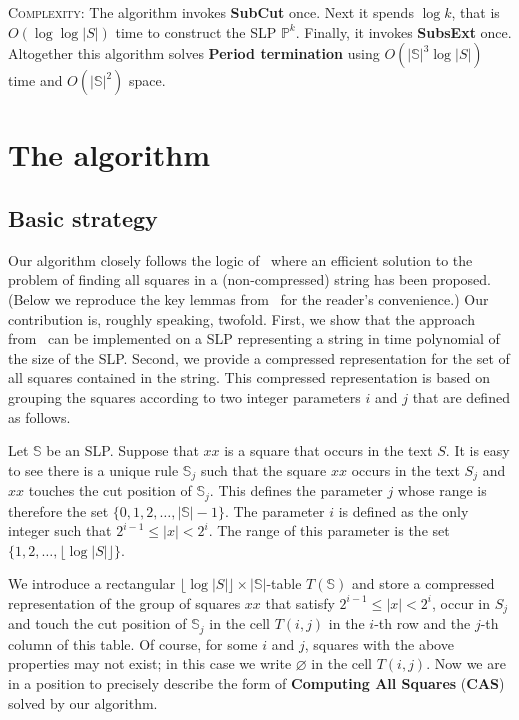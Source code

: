\documentclass[11pt]{article}
\theoremstyle{break}
\newcommand{\slp}[1]{\mathbb{#1}}
\begin{document}
\smallskip

\noindent \textsc{Complexity:} The algorithm invokes \textbf{SubCut} once. Next it spends $\log k$, that is $O(\log\log|S|)$ time to
construct the SLP $\slp{P}^k$. Finally, it invokes \textbf{SubsExt} once. Altogether this algorithm solves \textbf{Period termination}
using $O(|\slp{S}|^3 \log|S|)$ time and $O(|\slp{S}|^2)$ space.

\section{The algorithm}

\subsection{Basic strategy}

Our algorithm closely follows the logic of~\cite{2} where an efficient solution to the problem of finding all squares in a (non-compressed)
string has been proposed. (Below we reproduce the key lemmas from~\cite{2} for the reader's convenience.) Our contribution is, roughly
speaking, twofold. First, we show that the approach from~\cite{2} can be implemented on a SLP representing a string in time polynomial of
the size of the SLP. Second, we provide a compressed representation for the set of all squares contained in the string. This compressed
representation is based on grouping the squares according to two integer parameters $i$ and $j$ that are defined as follows.

Let $\slp{S}$ be an SLP. Suppose that $xx$ is a square that occurs in the text $S$. It is easy to see there is a unique rule $\slp{S}_j$
such that the square $xx$ occurs in the text $S_j$ and $xx$ touches the cut position of $\slp{S}_j$. This defines the parameter $j$ whose
range is therefore the set $\{0,1,2, \dots, |\slp{S}|-1\}$. The parameter $i$ is defined as the only integer such that
$2^{i-1}\le|x|<2^{i}$. The range of this parameter is the set $\{1,2, \dots, \lfloor\log|S|\rfloor\}$.

We introduce a rectangular $\lfloor\log|S|\rfloor\times |\slp{S}|$-table $T(\slp{S})$ and store a compressed representation of the group of
squares $xx$ that satisfy $2^{i-1}\le |x|<2^i$, occur in $S_j$ and touch the cut position of $\slp{S}_j$ in the cell $T(i,j)$ in the $i$-th
row and the $j$-th column of this table. Of course, for some $i$ and $j$, squares with the above properties may not exist; in this case we
write $\varnothing$ in the cell $T(i,j)$. Now we are in a position to precisely describe the form of \textbf{Computing All Squares}
(\textbf{CAS}) solved by our algorithm.
\end{document}
